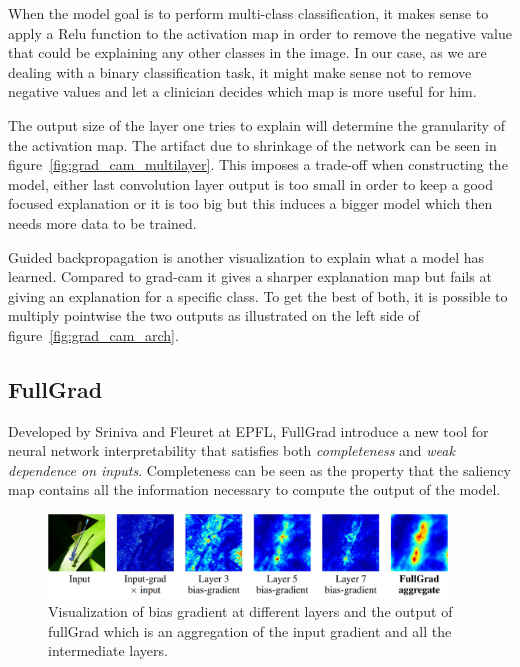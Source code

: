 When the model goal is to perform multi-class classification, it makes sense to apply a Relu function to the activation map in order to remove the negative value that could be explaining any other classes in the image. In our case, as we are dealing with a binary classification task, it might make sense not to remove negative values and let a clinician decides which map is more useful for him.

The output size of the layer one tries to explain will determine the granularity of the activation map. The artifact due to shrinkage of the network can be seen in figure~\ref{fig:grad_cam_multilayer}. This imposes a trade-off when constructing the model, either last convolution layer output is too small in order to keep a good focused explanation or it is too big but this induces a bigger model which then needs more data to be trained.

Guided backpropagation\cite{guided_backprop_springenberg2014striving} is another visualization to explain what a model has learned. Compared to grad-cam it gives a sharper explanation map but fails at giving an explanation for a specific class. To get the best of both, it is possible to multiply pointwise the two outputs as illustrated on the left side of figure~\ref{fig:grad_cam_arch}.


\subsection{FullGrad}
\label{sec:fullgrad}

Developed by Sriniva and Fleuret at EPFL, FullGrad\cite{fullgradient} introduce a new tool for neural network interpretability that satisfies both \textit{completeness} and \textit{weak dependence on inputs}. Completeness can be seen as the property that the saliency map contains all the information necessary to compute the output of the model.

\begin{figure}
    \centering
    \includegraphics[width=400]{figures/fullgrad_layer_agregation.png}
    \caption[FullGradExample]{Visualization\cite{fullgradient} of bias gradient at different layers and the output of fullGrad which is an aggregation of the input gradient and all the intermediate layers.}
    \label{fig:full_grad_layer_aggreagtion}
\end{figure}

